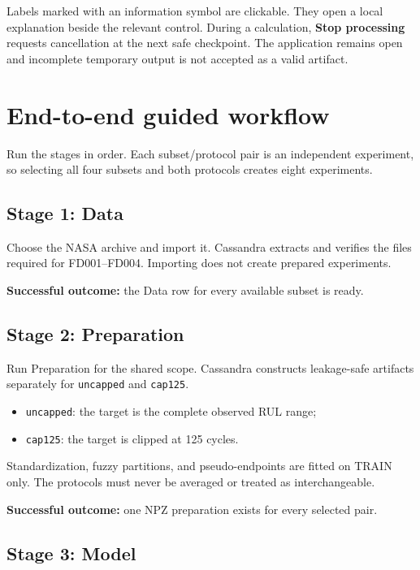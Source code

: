 \documentclass[11pt,a4paper]{article}
\begin{document}
Labels marked with an information symbol are clickable. They open a local
explanation beside the relevant control. During a calculation,
\textbf{Stop processing} requests cancellation at the next safe checkpoint. The
application remains open and incomplete temporary output is not accepted as a
valid artifact.

\section{End-to-end guided workflow}

Run the stages in order. Each subset/protocol pair is an independent experiment,
so selecting all four subsets and both protocols creates eight experiments.

\subsection{Stage 1: Data}

Choose the NASA archive and import it. Cassandra extracts and verifies the files
required for FD001--FD004. Importing does not create prepared experiments.

\textbf{Successful outcome:} the Data row for every available subset is ready.

\subsection{Stage 2: Preparation}

Run Preparation for the shared scope. Cassandra constructs leakage-safe
artifacts separately for \texttt{uncapped} and \texttt{cap125}.

\begin{itemize}
  \item \texttt{uncapped}: the target is the complete observed RUL range;
  \item \texttt{cap125}: the target is clipped at 125 cycles.
\end{itemize}

Standardization, fuzzy partitions, and pseudo-endpoints are fitted on TRAIN only.
The protocols must never be averaged or treated as interchangeable.

\textbf{Successful outcome:} one NPZ preparation exists for every selected pair.

\subsection{Stage 3: Model}
\end{document}
